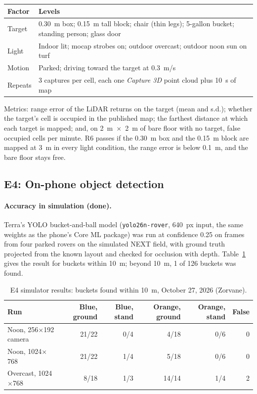 \begin{center}
\small
\begin{tabularx}{\textwidth}{@{}l X@{}}
\toprule
Factor & Levels \\
\midrule
Target & 0.30~m box; 0.15~m tall block; chair (thin legs); 5-gallon bucket; standing person; glass door \\
Light & Indoor lit; mocap strobes on; outdoor overcast; outdoor noon sun on turf \\
Motion & Parked; driving toward the target at 0.3~m/s \\
Repeats & 3 captures per cell, each one \emph{Capture 3D} point cloud plus 10~s of map \\
\bottomrule
\end{tabularx}
\end{center}

Metrics: range error of the LiDAR returns on the target (mean and s.d.); whether the target's cell is occupied in the published map; the farthest distance at which each target is mapped; and, on 2~m~$\times$~2~m of bare floor with no target, false occupied cells per minute.
R6 passes if the 0.30~m box and the 0.15~m block are mapped at 3~m in every light condition, the range error is below 0.1~m, and the bare floor stays free.

\subsection{E4: On-phone object detection}
\label{sec:phone-e4}

\paragraph{Accuracy in simulation (done).}
Terra's YOLO bucket-and-ball model (\texttt{yolo26n-rover}, 640~px input, the same weights as the phone's Core ML package) was run at confidence 0.25 on frames from four parked rovers on the simulated NEXT field, with ground truth projected from the known layout and checked for occlusion with depth.
Table~\ref{tab:phone-e4} gives the result for buckets within 10~m; beyond 10~m, 1 of 126 buckets was found.

\begin{table}[ht]
\centering
\caption{E4 simulator results: buckets found within 10~m, October 27, 2026 (Zorvane).}
\label{tab:phone-e4}
\small
\begin{tabular}{@{}l r r r r r@{}}
\toprule
Run & Blue, ground & Blue, stand & Orange, ground & Orange, stand & False \\
\midrule
Noon, 256$\times$192 camera & 21/22 & 0/4 & 4/18 & 0/6 & 0 \\
Noon, 1024$\times$768 & 21/22 & 1/4 & 5/18 & 0/6 & 0 \\
Overcast, 1024$\times$768 & 8/18 & 1/3 & 14/14 & 1/4 & 2 \\
\bottomrule
\end{tabular}
\end{table}

